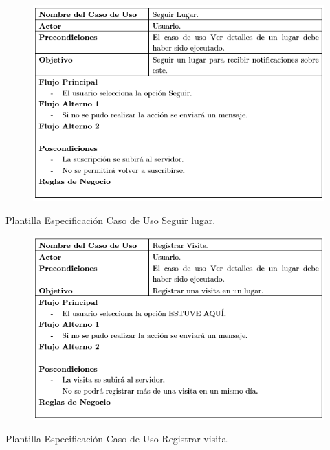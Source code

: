 \documentclass[12pt,letterpaper,openany]{book}
\begin{document}
\begin{table}[H]
\begin{center}
\begin{figure}[H]
\begin{center}
\includegraphics[width=13cm]{./imagenes/PCU/seguir_lugar}
\end{center}
\end{figure}
\end{center}
\caption{Plantilla Especificación Caso de Uso Seguir lugar.}
\end{table}

\begin{table}[H]
\begin{center}
\begin{figure}[H]
\begin{center}
\includegraphics[width=13cm]{./imagenes/PCU/registrar_visita}
\end{center}
\end{figure}
\end{center}
\caption{Plantilla Especificación Caso de Uso Registrar visita.}
\end{table}
\end{document}
